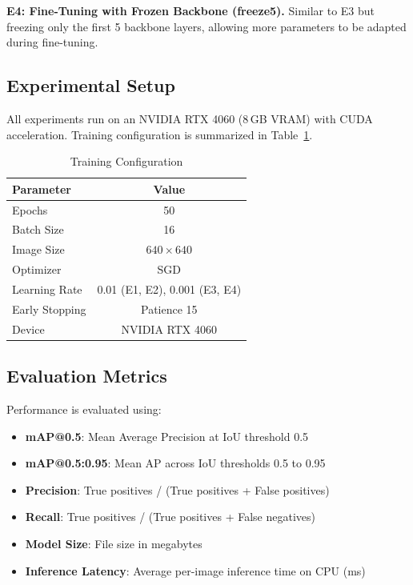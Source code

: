 \documentclass[conference,a4paper]{IEEEtran}
\begin{document}
\textbf{E4: Fine-Tuning with Frozen Backbone (freeze5).} Similar to E3 but freezing only the first 5 backbone layers, allowing more parameters to be adapted during fine-tuning.

\subsection{Experimental Setup}

All experiments run on an NVIDIA RTX 4060 (8\,GB VRAM) with CUDA acceleration. Training configuration is summarized in Table~\ref{tab:training}.

\begin{table}[htbp]
\caption{Training Configuration}
\label{tab:training}
\centering
\begin{tabular}{lc}
\toprule
Parameter & Value \\
\midrule
Epochs & 50 \\
Batch Size & 16 \\
Image Size & $640 \times 640$ \\
Optimizer & SGD \\
Learning Rate & 0.01 (E1, E2), 0.001 (E3, E4) \\
Early Stopping & Patience 15 \\
Device & NVIDIA RTX 4060 \\
\bottomrule
\end{tabular}
\end{table}

\subsection{Evaluation Metrics}

Performance is evaluated using:
\begin{itemize}
    \item \textbf{mAP@0.5}: Mean Average Precision at IoU threshold 0.5
    \item \textbf{mAP@0.5:0.95}: Mean AP across IoU thresholds 0.5 to 0.95
    \item \textbf{Precision}: True positives / (True positives + False positives)
    \item \textbf{Recall}: True positives / (True positives + False negatives)
    \item \textbf{Model Size}: File size in megabytes
    \item \textbf{Inference Latency}: Average per-image inference time on CPU (ms)
\end{itemize}
\end{document}
